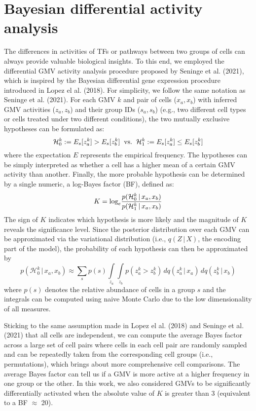 \section{Bayesian differential activity analysis}\label{methods:bf}
The differences in activities of TFs or pathways between two groups of cells can always provide valuable biological insights. To this end, we employed the differential GMV activity analysis procedure proposed by Seninge et al. (2021), which is inspired by the Bayesian differential gene expression procedure introduced in Lopez el al. (2018). For simplicity, we follow the same notation as Seninge et al. (2021). For each GMV $k$ and pair of cells ($x_a, x_b$) with inferred GMV activities ($z_a, z_b$) and their group IDs ($s_a, s_b$) (e.g., two different cell types or cells treated under two different conditions), the two mutually exclusive hypotheses can be formulated as:
\begin{equation}
    \mathcal{H}^k_0 := E_s[z^k_a] > E_s[z^k_b]\;\;\textnormal{vs.}\;\;\mathcal{H}^k_1 := E_s[z^k_a] \leq E_s[z^k_b]
\end{equation}
where the expectation $E$ represents the empirical frequency. The hypotheses can be simply interpreted as whether a cell has a higher mean of a certain GMV activity than another. Finally, the more probable hypothesis can be determined by a single numeric, a log-Bayes factor\cite{Kass1995,Held2018} (BF), defined as:
\begin{equation}
    K = \textnormal{log}_e \frac{p(\mathcal{H}^k_0\,|\,x_a, x_b)}{p(\mathcal{H}^k_1\,|\,x_a,x_b)}
\end{equation}
The sign of $K$ indicates which hypothesis is more likely and the magnitude of $K$ reveals the significance level. Since the posterior distribution over each GMV can be approximated via the variational distribution (i.e., $q(Z\,|\,X)$, the encoding part of the model), the probability of each hypothesis can then be approximated by
\begin{equation}
    p(\mathcal{H}^k_0\,|\,x_a, x_b) \approx \sum_{s}p(s)\int\limits_{z_a}\int\limits_{z_b}p(z^k_a > z^k_b)\,dq(z^k_a\,|\,x_a)\,dq(z^k_b\,|\,x_b)
\end{equation}
where $p(s)$ denotes the relative abundance of cells in a group $s$ and the integrals can be computed using naive Monte Carlo\cite{math2021} due to the low dimensionality of all measures.

Sticking to the same assumption made in Lopez el al. (2018) and Seninge et al. (2021) that all cells are independent, we can compute the average Bayes factor across a large set of cell pairs where cells in each cell pair are randomly sampled and can be repeatedly taken from the corresponding cell groups (i.e., permutations), which brings about more comprehensive cell comparisons. The average Bayes factor can tell us if a GMV is more active at a higher frequency in one group or the other. In this work, we also considered GMVs to be significantly differentially activated when the absolute value of $K$ is greater than 3 (equivalent to a BF $\approx$ 20)\cite{Seninge2021,Kass1995,Lopez2018}.

